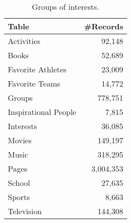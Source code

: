\documentclass[letterpaper]{article}
\begin{document}
\begin{table}
\centering
\caption{\small Groups of interests.}
\label{tab:interests}
\begin{tabular}{|>{\small}l|>{\small}r|}
\hline
\textbf{Table} & \textbf{\#Records} \\
\hline
Activities & 92,148 \\
\hline
Books & 52,689 \\
\hline
Favorite Athletes & 23,009 \\
\hline
Favorite Teams & 14,772 \\
\hline
Groups & 778,751 \\
\hline
Inspirational People & 7,815 \\
\hline
Interests & 36,085 \\
\hline
Movies & 149,197 \\
\hline
Music & 318,295 \\
\hline
Pages & 3,004,353 \\
\hline
School & 27,635 \\
\hline
Sports & 8,663 \\
\hline
Television & 144,308 \\
\hline
\end{tabular}
\end{table}
\end{document}

